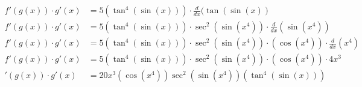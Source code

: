 \documentclass[preview]{standalone}
\begin{document}
\begin{align*}
f'(g(x)) \cdot g'(x)&=5(\tan^4(\sin(x))) \cdot \frac{d}{dx}(\tan(\sin(x)) \\ f'(g(x))\cdot g'(x)&=5(\tan^4(\sin(x))) \cdot \sec^2(\sin(x^4)) \cdot \frac{d}{dx}(\sin(x^4)) \\ f'(g(x))\cdot g'(x)&=5(\tan^4(\sin(x))) \cdot \sec^2(\sin(x^4)) \cdot (\cos(x^4)) \cdot \frac{d}{dx}(x^4) \\ f'(g(x))\cdot g'(x)&=5(\tan^4(\sin(x))) \cdot \sec^2(\sin(x^4)) \cdot (\cos(x^4)) \cdot 4x^3 \\ '(g(x))\cdot g'(x)&=20x^3(\cos(x^4))\sec^2(\sin(x^4))(\tan^4(\sin(x)))
\end{align*}
\end{document}
